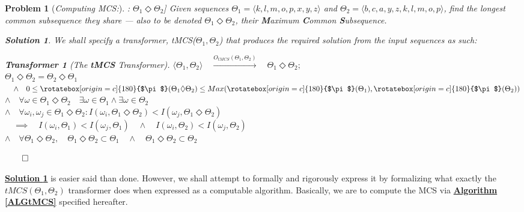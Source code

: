 \documentclass[a4paper, 18pt]{book} %
\newtheorem{transf}{Transformer}
\newtheorem{prob}{Problem}
\newtheorem{soln}{Solution}
\newcommand{\invpi}{\rotatebox[origin=c]{180}{$\pi$}}
\begin{document}
\begin{prob}[\textit{Computing MCS:}]: $\Theta_1 \Diamond \Theta_2$] 
\label{PROBMCS}
Given sequences $\Theta_1 = \langle k, l, m, o, p, x, y, z \rangle$ and $\Theta_2 = \langle b, c, a, y, z, k, l, m, o, p \rangle$, find the longest common subsequence they share --- also to be denoted $\Theta_1 \Diamond \Theta_2$, their \textbf{M}aximum \textbf{C}ommon \textbf{S}ubsequence.

\vspace{1em}
\begin{soln}
\label{SOLMCS}
We shall specify a transformer, tMCS($\Theta_1,\Theta_2$) that produces the required solution from the input sequences as such:

\begin{transf}[The \textbf{tMCS} Transformer]
\label{TRANSFMCS}
$\langle \Theta_1,\Theta_2 \rangle  \quad \xrightarrow{O_{tMCS}(\Theta_1,\Theta_2)} \quad \Theta_1 \Diamond \Theta_2;$\\
$\Theta_1 \Diamond \Theta_2 = \Theta_2 \Diamond \Theta_1$
$\quad \land \quad 0 \leq \invpi(\Theta_1 \Diamond \Theta_2) \leq Max(\invpi(\Theta_1), \invpi(\Theta_2))$\\
$\land \quad \forall \omega \in \Theta_1 \Diamond \Theta_2 \quad \exists \omega \in \Theta_1 \land \exists \omega \in \Theta_2$\\
$\land \quad \forall \omega_i, \omega_j \in \Theta_1 \Diamond \Theta_2 : I(\omega_i, \Theta_1 \Diamond \Theta_2) < I(\omega_j, \Theta_1 \Diamond \Theta_2) \quad $\\
$\quad \implies \quad I(\omega_i, \Theta_1) < I(\omega_j, \Theta_1) \quad \land \quad I(\omega_i, \Theta_2) < I(\omega_j, \Theta_2)$\\
$\land \quad \forall \Theta_1 \Diamond \Theta_2, \quad \Theta_1 \Diamond \Theta_2 \subset \Theta_1 \quad \land \quad \Theta_1 \Diamond \Theta_2 \subset \Theta_2$
\end{transf}
$\qed$
\end{soln}
\end{prob}
\vspace{1em}

\textbf{\hyperref[SOLMCS]{Solution \ref{SOLMCS}}} is easier said than done. However, we shall attempt to formally and rigorously express it by formalizing what exactly the $tMCS(\Theta_1,\Theta_2)$ transformer does when expressed as a computable algorithm. Basically, we are to compute the MCS via \textbf{\hyperref[ALGtMCS]{Algorithm \ref{ALGtMCS}}} specified hereafter.
\end{document}

